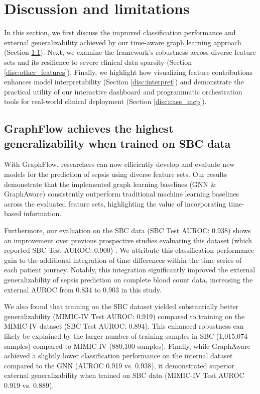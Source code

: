 \documentclass[pdflatex,sn-mathphys-num,lineno]{sn-jnl}
\theoremstyle{thmstyleone}%
\theoremstyle{thmstyletwo}%
\theoremstyle{thmstylethree}%
\begin{document}
\section{Discussion and limitations}\label{discussion}
In this section, we first discuss the improved classification performance and external generalizability achieved by our time-aware graph learning approach (Section \ref{disc:cbc}). Next, we examine the framework's robustness across diverse feature sets and its resilience to severe clinical data sparsity (Section \ref{disc:other_features}). Finally, we highlight how visualizing feature contributions enhances model interpretability (Section \ref{disc:interpret}) and demonstrate the practical utility of our interactive dashboard and programmatic orchestration tools for real-world clinical deployment (Section \ref{disc:case_mcp}).

\subsection{GraphFlow achieves the highest generalizability when trained on SBC
data}\label{disc:cbc}
With GraphFlow, researchers can now efficiently develop and evaluate new models for the prediction of sepsis using diverse feature sets. Our results demonstrate that the implemented graph learning baselines (GNN \& GraphAware) consistently outperform traditional machine learning baselines across the evaluated feature sets, highlighting the value of incorporating time-based information.

Furthermore, our evaluation on the SBC data (SBC Test AUROC: 0.938) shows an improvement over previous prospective studies evaluating this dataset (which reported SBC Test AUROC: 0.900) \cite{walke2023edges}. We attribute this classification performance gain to the additional integration of time differences within the time series of each patient journey. Notably, this integration significantly improved the external generalizability of sepsis prediction on complete blood count data, increasing the external AUROC from 0.834 \cite{walke2023edges} to 0.903 in this study.

We also found that training on the SBC dataset yielded substantially better generalizability (MIMIC-IV Test AUROC: 0.919) compared to training on the MIMIC-IV dataset (SBC Test AUROC: 0.894). This enhanced robustness can likely be explained by the larger number of training samples in SBC (1,015,074 samples) compared to MIMIC-IV (880,100 samples). Finally, while GraphAware achieved a slightly lower classification performance on the internal dataset compared to the GNN (AUROC 0.919 vs. 0.938), it demonstrated superior external generalizability when trained on SBC data (MIMIC-IV Test AUROC 0.919 vs. 0.889).
\end{document}

